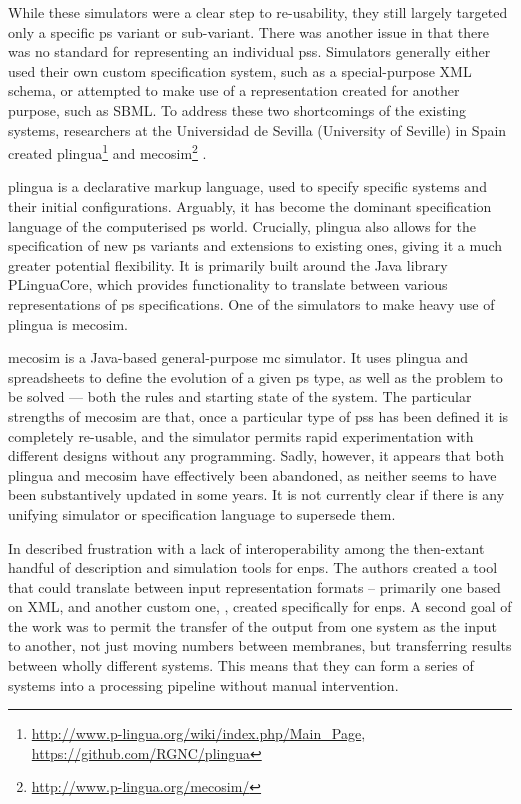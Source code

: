 While these simulators were a clear step to re-usability, they still largely targeted only a specific \gls{ps} variant or sub-variant.  There was another issue in that there was no standard for representing an individual \glspl{ps}.  Simulators generally either used their own custom specification system, such as a special-purpose XML schema, or attempted to make use of a representation created for another purpose, such as SBML.  To address these two shortcomings of the existing systems, researchers at the Universidad de Sevilla (University of Seville) in Spain created \gls{plingua}\footnote{\url{http://www.p-lingua.org/wiki/index.php/Main_Page}, \url{https://github.com/RGNC/plingua}} \cite{Diaz-Pernil2008a,Garcia-Quismondo2010} and \gls{mecosim}\footnote{\url{http://www.p-lingua.org/mecosim/}} \cite{Perez-Hurtado2010}.

\Gls{plingua} is a declarative markup language, used to specify specific systems and their initial configurations.  Arguably, it has become the dominant specification language of the computerised \gls{ps} world.  Crucially, \gls{plingua} also allows for the specification of new \gls{ps} variants and extensions to existing ones, giving it a much greater potential flexibility.  It is primarily built around the Java library PLinguaCore, which provides functionality to translate between various representations of \gls{ps} specifications.  One of the simulators to make heavy use of \gls{plingua} is \gls{mecosim}.

\Gls{mecosim} is a Java-based general-purpose \gls{mc} simulator.  It uses \gls{plingua} and spreadsheets to define the evolution of a given \gls{ps} type, as well as the problem to be solved --- both the rules and starting state of the system.  The particular strengths of \gls{mecosim} are that, once a particular type of \glspl{ps} has been defined it is completely re-usable, and the simulator permits rapid experimentation with different designs without any programming.  Sadly, however, it appears that both \gls{plingua} and \gls{mecosim} have effectively been abandoned, as neither seems to have been substantively updated in some years.  It is not currently clear if there is any unifying simulator or specification language to supersede them.

In \cite{Raghavan2020a} \citeauthor{Raghavan2020a} described frustration with a lack of interoperability among the then-extant handful of description and simulation tools for \gls{enps}.  The authors created a tool that could translate between input representation formats -- primarily one based on XML, and another custom one, , created specifically for \gls{enps}.  A second goal of the work was to permit the transfer of the output from one system as the input to another, \ie{} not just moving numbers between membranes, but transferring results between wholly different systems.  This means that they can form a series of systems into a processing pipeline without manual intervention.

